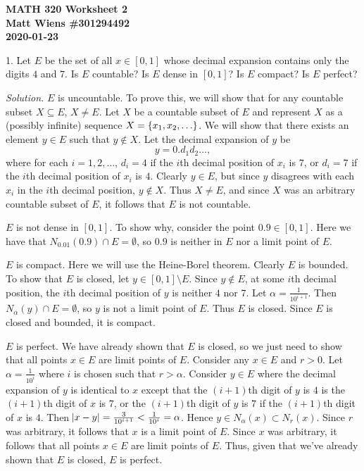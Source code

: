 \documentclass{article}
\begin{document}
\textbf{MATH 320 Worksheet 2} \\
\textbf{Matt Wiens \#301294492} \\
\textbf{2020-01-23}

1. Let $E$ be the set of all $x \in [0, 1]$ whose decimal expansion
   contains only the digits $4$ and $7$. Is $E$ countable? Is $E$ dense
   in $[0, 1]$? Is $E$ compact? Is $E$ perfect?

\textit{Solution.}
$E$ is uncountable. To prove this, we will show that for any countable
subset $X \subseteq E$, $X \neq E$. Let $X$ be a countable subset of $E$
and represent $X$ as a (possibly infinite) sequence $X = \cbr{x_1, x_2,
\ldots}$. We will show that there exists an element $y \in E$ such that
$y \not\in X$. Let the decimal expansion of $y$ be
%
\begin{equation*}
    y = 0 . d_1 d_2 \ldots
    ,
\end{equation*}
%
where for each $i = 1, 2, \ldots$, $d_i = 4$ if the $i$th decimal
position of $x_i$ is $7$, or $d_i = 7$ if the $i$th decimal position of
$x_i$ is $4$. Clearly $y \in E$, but since $y$ disagrees with each $x_i$
in the $i$th decimal position, $y \not\in X$. Thus $X \neq E$, and since
$X$ was an arbitrary countable subset of $E$, it follows that $E$ is not
countable.

$E$ is not dense in $[0, 1]$. To show why, consider the point $0.9 \in
[0, 1]$. Here we have that $N_{0.01}(0.9) \cap E = \emptyset$, so $0.9$
is neither in $E$ nor a limit point of $E$.

$E$ is compact. Here we will use the Heine-Borel theorem. Clearly $E$ is
bounded. To show that $E$ is closed, let $y \in [0, 1] \setminus E$.
Since $y \not\in E$, at some $i$th decimal position, the $i$th decimal
position of $y$ is neither $4$ nor $7$. Let $\alpha = \frac{1}{10^{i +
1}}$. Then $N_\alpha (y) \cap E = \emptyset$, so $y$ is not a limit
point of $E$. Thus $E$ is closed. Since $E$ is closed and bounded, it is
compact.

$E$ is perfect. We have already shown that $E$ is closed, so we just
need to show that all points $x \in E$ are limit points of $E$. Consider
any $x \in E$ and $r > 0$. Let $\alpha = \frac{1}{10^{i}}$ where $i$ is
chosen such that $r > \alpha$. Consider $y \in E$ where the decimal
expansion of $y$ is identical to $x$ except that the $(i + 1)$th digit
of $y$ is $4$ is the $(i + 1)$th digit of $x$ is $7$, or the $(i + 1)$th
digit of $y$ is $7$ if the $(i + 1)$th digit of $x$ is $4$. Then
$\envert{x - y} = \frac{3}{10^{i + 1}} < \frac{1}{10^i} = \alpha$. Hence
$y \in N_\alpha (x) \subset N_r(x)$. Since $r$ was arbitrary, it follows
that $x$ is a limit point of $E$. Since $x$ was arbitrary, it follows
that all points $x \in E$ are limit points of $E$. Thus, given that
we've already shown that $E$ is closed, $E$ is perfect.
\end{document}
